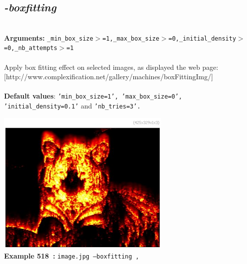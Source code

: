 \documentclass[a4paper,11pt,twoside]{book}
\begin{document}
\subsection{\emph{-boxfitting} }\vspace*{-0.5em}
~\\\textbf{Arguments: } 
{\small \texttt{\_min\_box\_size$>$=1,\_max\_box\_size$>$=0,\_initial\_density$>$=0,\_nb\_attempts$>$=1}}\\~\\
Apply box fitting effect on selected images, as displayed the web page:
[http://www.complexification.net/gallery/machines/boxFittingImg/]
~\\~\\\textbf{Default values}: {\small \texttt{'min\_box\_size=1', 'max\_box\_size=0', 'initial\_density=0.1'} and \texttt{'nb\_tries=3'.}}
\begin{center}\includegraphics[keepaspectratio=true,height=7cm,width=\textwidth]{img/gmic_def518.jpg}\\
{\footnotesize \textbf{Example 518~:} \texttt{image.jpg --boxfitting ,}}
\end{center}
\end{document}

